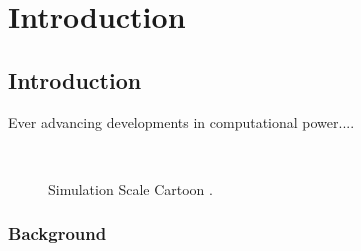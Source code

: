 \chapter{Introduction}
\graphicspath{{Figures/IntroductionFigs/}}

\section{Introduction}

Ever advancing developments in computational power....

\begin{figure}[htbp]
\begin{center}
  \mbox{
       }
   \caption{Simulation Scale Cartoon \citep{nielsen2004cgm}.}
   \label{fig:Simscale}
\end{center}
\end{figure}

\subsection{Background}





